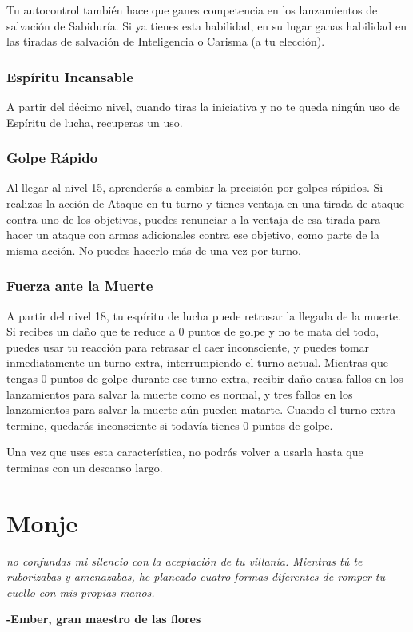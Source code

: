 \documentclass[a4paper,twocolumn,openany,10pt]{dndbook}
\begin{document}
Tu autocontrol también hace que ganes competencia en los lanzamientos de salvación de Sabiduría. Si ya tienes esta habilidad,
en su lugar ganas habilidad en las tiradas de salvación de Inteligencia o Carisma (a tu elección).

\subsubsection{Espíritu Incansable}
A partir del décimo nivel, cuando tiras la iniciativa y no te queda ningún uso de Espíritu de lucha, recuperas un uso. 

\subsubsection{Golpe Rápido}
Al llegar al nivel 15, aprenderás a cambiar la precisión por golpes rápidos. Si realizas la acción de Ataque en tu turno y
tienes ventaja en una tirada de ataque contra uno de los objetivos, puedes renunciar a la ventaja de esa tirada para hacer un
ataque con armas adicionales contra ese objetivo, como parte de la misma acción. No puedes hacerlo más de una vez por turno.

\subsubsection{Fuerza ante la Muerte}
A partir del nivel 18, tu espíritu de lucha puede retrasar la llegada de la muerte. Si recibes un daño que te reduce a 0 puntos
de golpe y no te mata del todo, puedes usar tu reacción para retrasar el caer inconsciente, y puedes tomar inmediatamente un
turno extra, interrumpiendo el turno actual. Mientras que tengas 0 puntos de golpe durante ese turno extra, recibir daño causa
fallos en los lanzamientos para salvar la muerte como es normal, y tres fallos en los lanzamientos para salvar la muerte aún
pueden matarte. Cuando el turno extra termine, quedarás inconsciente si todavía tienes 0 puntos de golpe.

Una vez que uses esta característica, no podrás volver a usarla hasta que terminas con un descanso largo. 

\section{Monje}
\begin{quotebox}
	\textit{no confundas mi silencio con la aceptación de tu villanía. Mientras tú te ruborizabas y amenazabas, he planeado
	cuatro formas diferentes de romper tu cuello con mis propias manos.}

	\begin{flushright}
	\textbf{-Ember, gran maestro de las flores}
	\end{flushright}
\end{quotebox}
\end{document}
